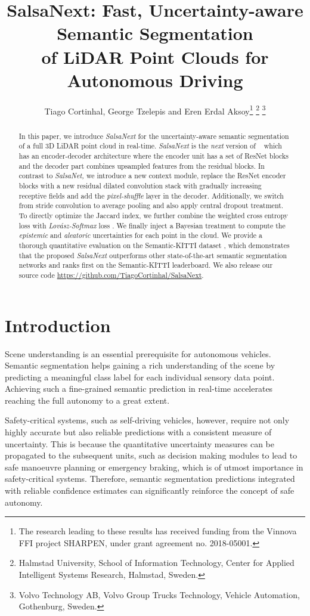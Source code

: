 \documentclass[letterpaper, 10 pt, conference]{ieeeconf}
\title{\LARGE \bf
SalsaNext: Fast, Uncertainty-aware Semantic Segmentation \\ of LiDAR Point Clouds for Autonomous Driving
}
\author{Tiago Cortinhal, George Tzelepis and Eren Erdal Aksoy\thanks{The research leading to these results has received funding from the Vinnova FFI project SHARPEN, under grant agreement no. 2018-05001.}
\thanks{Halmstad University, School of Information Technology, Center for Applied Intelligent Systems Research, Halmstad, Sweden.} 
\thanks{Volvo Technology AB, Volvo Group Trucks Technology, Vehicle Automation, Gothenburg, Sweden.
}}
\newcommand{\snx}[1]{\textit{SalsaNext }{#1}}
\newcommand{\sn}[1]{\textit{SalsaNet }{#1}}
\newcommand{\snk}[1]{\textit{SalsaNet, }{#1}}
\newcommand{\ls}[1]{\textit{Lov\'{a}sz-Softmax }{#1}}
\newcommand{\sk}[1]{Semantic-KITTI {#1}}
\begin{document}
\maketitle
\thispagestyle{empty}
\pagestyle{empty}

 
\begin{abstract}

In this paper, we introduce   \snx   for the uncertainty-aware semantic  segmentation of a full 3D LiDAR point cloud in real-time.
\snx is the \textit{next} version of \sn ~\cite{salsanet2020} which has an encoder-decoder architecture where the encoder unit has a set of ResNet blocks and the decoder part combines upsampled features from the residual blocks. 
In contrast to   \snk we   introduce a new context module, replace the ResNet encoder blocks with   a new residual dilated convolution stack with   gradually increasing receptive fields and add the \textit{pixel-shuffle} layer in the decoder.
Additionally, we switch from stride convolution to average pooling and also apply central dropout treatment.
To directly optimize the Jaccard index, we further combine  the weighted cross entropy loss  with \ls loss \cite{berman2018lovasz}.
We finally inject a Bayesian treatment to compute  the \textit{epistemic}  and  \textit{aleatoric}   uncertainties for each point in the cloud.
We provide a thorough quantitative  evaluation on the \sk dataset \cite{semantickitti}, which demonstrates that the proposed \snx outperforms other state-of-the-art semantic segmentation networks and ranks first on the \sk leaderboard.
We also release our source code \href{https://github.com/TiagoCortinhal/SalsaNext}{https://github.com/TiagoCortinhal/SalsaNext}.




\end{abstract}

\section{Introduction}


Scene understanding is an essential prerequisite for  autonomous vehicles.
Semantic segmentation helps gaining a rich understanding of the scene by predicting a meaningful class label   for each individual sensory data point. 
Achieving such a fine-grained semantic prediction in real-time   accelerates reaching the full autonomy to a great extent.

Safety-critical systems, such as self-driving vehicles, however,  require not only   highly  accurate but also   reliable predictions with a consistent measure of uncertainty. 
This is because the   quantitative uncertainty measures can be propagated to the subsequent units,  such as decision making modules to lead to safe manoeuvre  planning or emergency braking,   which is of utmost importance in safety-critical systems.
Therefore, semantic segmentation   predictions integrated with reliable confidence estimates can significantly reinforce the concept of safe autonomy.
  
\end{document}
